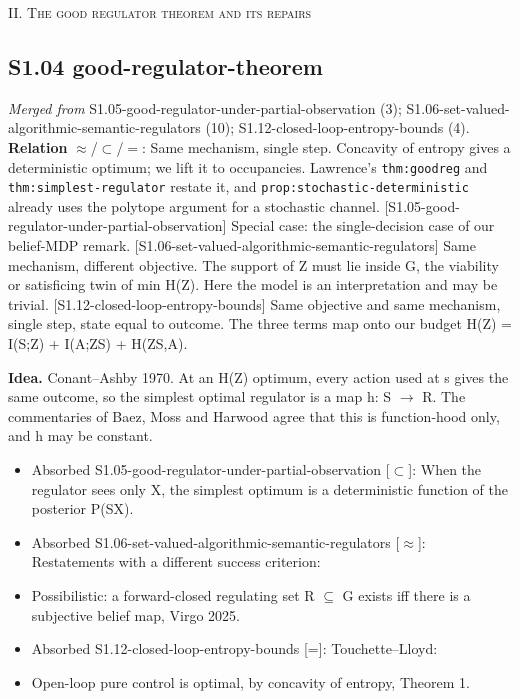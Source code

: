 \documentclass[10pt]{article}
\begin{document}
\medskip\textsc{II. The good regulator theorem and its repairs}

\subsection{S1.04 good-regulator-theorem}\label{node:S1-S1-04-good-regulator-theorem}
\textit{Merged from} S1.05-good-regulator-under-partial-observation (3); S1.06-set-valued-algorithmic-semantic-regulators (10); S1.12-closed-loop-entropy-bounds (4). \textbf{Relation} $\approx$/$\subset$/$=$: Same mechanism, single step. Concavity of entropy gives a deterministic optimum; we lift it to occupancies. Lawrence's \texttt{thm:goodreg} and \texttt{thm:simplest-regulator} restate it, and \texttt{prop:stochastic-deterministic} already uses the polytope argument for a stochastic channel. [S1.05-good-regulator-under-partial-observation] Special case: the single-decision case of our belief-MDP remark. [S1.06-set-valued-algorithmic-semantic-regulators] Same mechanism, different objective. The support of Z must lie inside G, the viability or satisficing twin of min H(Z). Here the model is an interpretation and may be trivial. [S1.12-closed-loop-entropy-bounds] Same objective and same mechanism, single step, state equal to outcome. The three terms map onto our budget H(Z) = I(S;Z) + I(A;Z\textbar{}S) + H(Z\textbar{}S,A).

\textbf{Idea.} Conant--Ashby 1970. At an H(Z) optimum, every action used at s gives the same outcome, so the simplest optimal regulator is a map h: S \ensuremath{\to} R. The commentaries of Baez, Moss and Harwood agree that this is function-hood only, and h may be constant.
\begin{itemize}[nosep,leftmargin=1.2em]
\item Absorbed S1.05-good-regulator-under-partial-observation [\ensuremath{\subset}]: When the regulator sees only X, the simplest optimum is a deterministic function of the posterior P(S\textbar{}X).
\item Absorbed S1.06-set-valued-algorithmic-semantic-regulators [\ensuremath{\approx}]: Restatements with a different success criterion:
\item Possibilistic: a forward-closed regulating set R \ensuremath{\subseteq} G exists iff there is a subjective belief map, Virgo 2025.
\item Absorbed S1.12-closed-loop-entropy-bounds [=]: Touchette--Lloyd:
\item Open-loop pure control is optimal, by concavity of entropy, Theorem 1.
\end{itemize}
\end{document}
